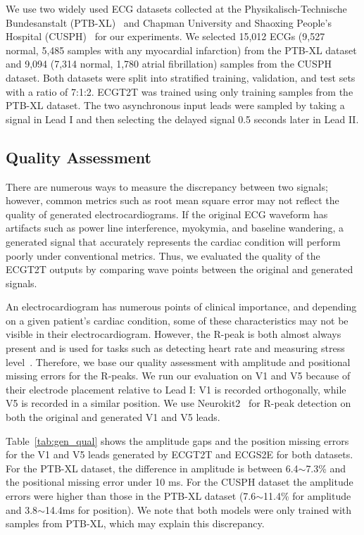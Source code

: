 We use two widely used ECG datasets collected at the Physikalisch-Technische Bundesanstalt (PTB-XL)~\cite{wag20} and Chapman University and Shaoxing People's Hospital (CUSPH)~\cite{zhe20} for our experiments. We selected 15,012 ECGs (9,527 normal, 5,485 samples with any myocardial infarction) from the PTB-XL dataset and 9,094 (7,314 normal, 1,780 atrial fibrillation) samples from the CUSPH dataset. Both datasets were split into stratified training, validation, and test sets with a ratio of 7:1:2. ECGT2T was trained using only training samples from the PTB-XL dataset. 
The two asynchronous input leads were sampled by taking a signal in Lead I and then selecting the delayed signal 0.5 seconds later in Lead II. 


\subsection{Quality Assessment}


There are numerous ways to measure the discrepancy between two signals; however, common metrics such as root mean square error may not reflect the quality of generated electrocardiograms. If the original ECG waveform has artifacts such as power line interference, myokymia, and baseline wandering, a generated signal that accurately represents the cardiac condition will perform poorly under conventional metrics. Thus, we evaluated the quality of the ECGT2T outputs by comparing wave points between the original and generated signals.

An electrocardiogram has numerous points of clinical importance, and depending on a given patient's cardiac condition, some of these characteristics may not be visible in their electrocardiogram. However, the R-peak is both almost always present and is used for tasks such as  detecting heart rate and measuring stress level~\cite{sad12}. Therefore, we base our quality assessment with amplitude and positional missing errors for the R-peaks. We run our evaluation on V1 and V5 because of their electrode placement relative to Lead I: V1 is recorded orthogonally, while V5 is recorded in a similar position. We use Neurokit2~\cite{neu21} for R-peak detection on both the original and generated V1 and V5 leads.

Table~\ref{tab:gen_qual} shows the amplitude gaps and the position missing errors for the V1 and V5 leads generated by ECGT2T and ECGS2E for both datasets. For the PTB-XL dataset, the difference in amplitude is between 6.4$\sim$7.3\% and the positional missing error under 10 ms. For the CUSPH dataset the amplitude errors were higher than those in the PTB-XL dataset (7.6$\sim$11.4\% for amplitude and 3.8$\sim$14.4ms for position). We note that both models were only trained with samples from PTB-XL, which may explain this discrepancy.


